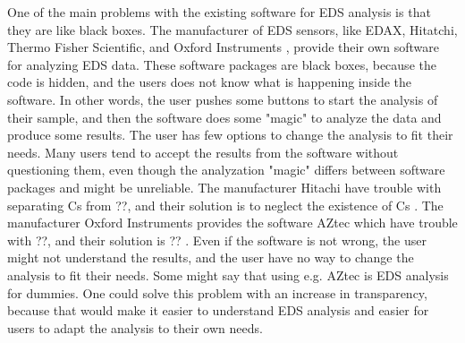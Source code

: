 One of the main problems with the existing software for EDS analysis is that they are like black boxes.
The manufacturer of EDS sensors, like EDAX, Hitatchi, Thermo Fisher Scientific, and Oxford Instruments , provide their own software for analyzing EDS data.
These software packages are black boxes, because the code is hidden, and the users does not know what is happening inside the software.
In other words, the user pushes some buttons to start the analysis of their sample, and then the software does some "magic" to analyze the data and produce some results.
The user has few options to change the analysis to fit their needs.
Many users tend to accept the results  from the software without questioning them, even though the analyzation "magic" differs between software packages and might be unreliable.
The manufacturer Hitachi have trouble with separating Cs from ??, and their solution is to neglect the existence of Cs .
The manufacturer Oxford Instruments provides the software AZtec which have trouble with ??, and their solution is ?? .
Even if the software is not wrong, the user might not understand the results, and the user have no way to change the analysis to fit their needs.
Some might say that using e.g. AZtec is EDS analysis for dummies.
One could solve this problem with an increase in transparency, because that would make it easier to understand EDS analysis and easier for users to adapt the analysis to their own needs.





%
%







%
%

